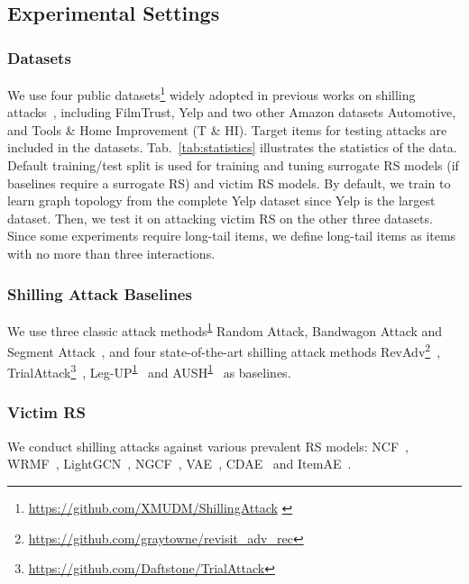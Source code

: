 \subsection{Experimental Settings} 

\subsubsection{Datasets}
We use four public datasets\footnote{\url{https://github.com/XMUDM/ShillingAttack} \label{footnote:legup}} widely adopted in previous works on shilling attacks~\citep{LinC0XLY20,abs-2206-11433}, including FilmTrust, Yelp and two other Amazon datasets Automotive, and Tools \& Home Improvement (T \& HI).
Target items for testing attacks are included in the datasets.
Tab.~\ref{tab:statistics} illustrates the statistics of the data.
Default training/test split is used for training and tuning surrogate RS models (if baselines require a surrogate RS) and victim RS models.
By default, we train \ours to learn graph topology from the complete Yelp dataset since Yelp is the largest dataset. 
Then, we test it on attacking victim RS on the other three datasets.
Since some experiments require long-tail items, we define long-tail items as items with no more than three interactions.


\subsubsection{Shilling Attack Baselines}
We use three classic attack methods\textsuperscript{\ref{footnote:legup}} Random Attack, Bandwagon Attack and Segment Attack~\citep{abs-2206-11433}, and four state-of-the-art shilling attack methods RevAdv\footnote{\url{https://github.com/graytowne/revisit_adv_rec}}~\citep{TangWW20}, TrialAttack\footnote{\url{https://github.com/Daftstone/TrialAttack}}~\citep{WuLGZC21}, Leg-UP\textsuperscript{\ref{footnote:legup}}~\citep{abs-2206-11433} and AUSH\textsuperscript{\ref{footnote:legup}}~\citep{LinC0XLY20} as baselines.



\subsubsection{Victim RS}
We conduct shilling attacks against various prevalent RS models: NCF~\citep{HeLZNHC17}, WRMF~\citep{HuKV08}, LightGCN~\citep{0001DWLZ020}, NGCF~\citep{Wang0WFC19}, VAE~\citep{LiangKHJ18}, CDAE~\citep{WuDZE16} and ItemAE~\citep{SedhainMSX15}.


